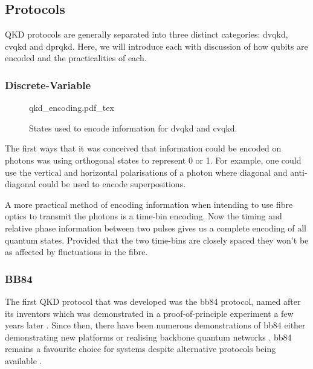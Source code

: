 

\subsection{Protocols}

\Ac{QKD} protocols are generally separated into three distinct categories: \acf{dvqkd}, \acf{cvqkd} and \acf{dprqkd}. Here, we will introduce each with discussion of how qubits are encoded and the practicalities of each.

\subsubsection{Discrete-Variable}

\begin{figure}
	\centering
	\def\svgwidth{0.9\textwidth}
   	{qkd_encoding.pdf_tex}
   	\caption[\acs{dvqkd} and \acs{cvqkd} encoding]{States used to encode information for \acs{dvqkd} and \acs{cvqkd}.}
\end{figure}

The first ways that it was conceived that information could be encoded on photons was using orthogonal states to represent 0 or 1. For example, one could use the vertical and horizontal polarisations of a photon where diagonal and anti-diagonal could be used to encode superpositions. 

A more practical method of encoding information when intending to use fibre optics to transmit the photons is a time-bin encoding. Now the timing and relative phase information between two pulses gives us a complete encoding of all quantum states. Provided that the two time-bins are closely spaced they won't be as affected by fluctuations in the fibre.

\subsubsection*{BB84}

The first \ac{QKD} protocol that was developed was the \ac{bb84} protocol, named after its inventors \cite{BB84} which was demonstrated in a proof-of-principle experiment a few years later \cite{bennett1992experimental}. Since then, there have been numerous demonstrations of \ac{bb84} either demonstrating new platforms or realising backbone quantum networks \cite{pirandola2019advances}. \Ac{bb84} remains a favourite choice for systems despite alternative protocols being available \cite{sarg2004, DPS-QKD, COW-QKD, B92}.


